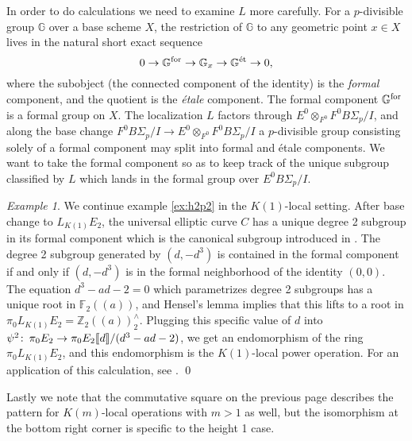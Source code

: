\documentclass{gtpart}
\theoremstyle{definition}
\theoremstyle{remark}
\newtheorem{exam}[thm]{Example}
\def\co{\colon\thinspace}
\newcommand{\mb}[1]{\mathbb{#1}}
\begin{document}
In order to do calculations we need to examine $L$ more carefully.  For a 
$p$-divisible group $\mb G$ over a base scheme $X$, the restriction of $\mb G$ 
to any geometric point $x \in X$ lives in the natural short exact sequence 
\[
 0 \to \mb G^{\rm for} \to \mb G_x \to \mb G^\text{\'et} \to 0, 
\]
where the subobject (the connected component of the identity) is the {\em 
formal} component, and the quotient is the {\em \'etale} component.  The 
formal component $\mb G^{\rm for}$ is a formal group on $X$.  The 
localization $L$ factors through $E^0 \otimes_{F^0} F^0 B\Sigma_p/I$, and 
along the base change $F^0 B\Sigma_p/I \to E^0 \otimes_{F^0} F^0 B\Sigma_p/I$ 
a $p$-divisible group consisting solely of a formal component may split into 
formal and \'etale components.  We want to take the formal component so as to 
keep track of the unique subgroup classified by $L$ which lands in the formal 
group over $E^0 B\Sigma_p/I$.  

\begin{exam}
\label{ex:h1p2}
 We continue example \ref{ex:h2p2} in the $K(1)$-local setting.  After base 
 change to $L_{K(1)} E_2$, the universal elliptic curve $C$ has a unique 
 degree 2 subgroup in its formal component which is the canonical subgroup 
 introduced in \cite[theorem 1.4]{lubin}.  The degree 2 subgroup generated by 
 $(d,-d^3)$ is contained in the formal component if and only if $(d,-d^3)$ is 
 in the formal neighborhood of the identity $(0,0)$.  The equation 
 $d^3 - a d - 2 = 0$ which parametrizes degree 2 subgroups has a unique root 
 in ${\mb F}_2 (\!(a)\!)$, and Hensel's lemma implies that this lifts to a 
 root in $\pi_0 L_{K(1)} E_2 = {\mb Z}_2 (\!(a)\!)_2^\wedge$.  Plugging this 
 specific value of $d$ into 
 $\psi^2\co \pi_0 E_2 \to \pi_0 E_2 \llbracket d \rrbracket /(d^3-ad-2)$, we 
 get an endomorphism of the ring $\pi_0 L_{K(1)} E_2$, and this endomorphism 
 is the $K(1)$-local power operation.  For an application of this calculation, 
 see \cite[section 6]{level3}.  \qed
\end{exam}

Lastly we note that the commutative square on the previous page describes the 
pattern for $K(m)$-local operations with $m > 1$ as well, but the isomorphism 
at the bottom right corner is specific to the height 1 case.  
\end{document}
